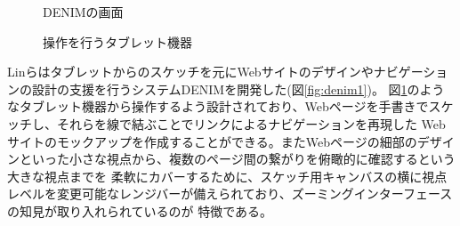 \begin{figure}[H] \begin{minipage}{0.5\hsize}
                         \begin{center} 
                         \end{center} \caption{DENIMの画面} \label{fig:denim1}
\end{minipage} \begin{minipage}{0.5\hsize}
                   \begin{center} 
                   \end{center} \caption{操作を行うタブレット機器} \label{fig:denim2}
\end{minipage}
\end{figure}

Linらはタブレットからのスケッチを元にWebサイトのデザインやナビゲーションの設計の支援を行うシステムDENIMを開発した\cite{Lin2000DENIMFA}(図\ref{fig:denim1})。
図\ref{fig:denim2}のようなタブレット機器から操作するよう設計されており、Webページを手書きでスケッチし、それらを線で結ぶことでリンクによるナビゲーションを再現した
Webサイトのモックアップを作成することができる。またWebページの細部のデザインといった小さな視点から、複数のページ間の繋がりを俯瞰的に確認するという大きな視点までを
柔軟にカバーするために、スケッチ用キャンバスの横に視点レベルを変更可能なレンジバーが備えられており、ズーミングインターフェースの知見が取り入れられているのが
特徴である。

